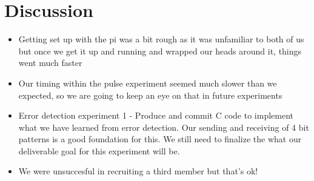 \documentclass{article}
\begin{document}
\section*{Discussion}
\begin{itemize}
\item Getting set up with the pi was a bit rough as it was unfamiliar to both of us but once we get it up and running and wrapped our heads around it, things went much faster
\item Our timing within the pulse experiment seemed much slower than we expected, so we are going to keep an eye on that in future experiments
\item Error detection experiment 1 - Produce and commit C code to implement what we have learned from error detection. Our sending and receiving of 4 bit patterns is a good foundation for this. We still need to finalize the what our deliverable goal for this experiment will be. 
\item We were unsuccesful in recruiting a third member but that's ok! 
\end{itemize}
\end{document}
